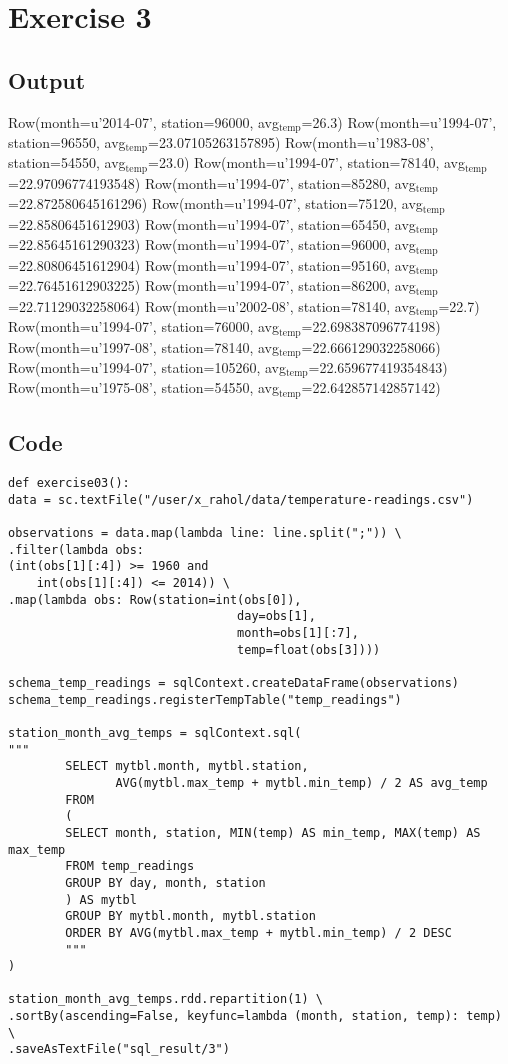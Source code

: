 \documentclass[10pt]{article}
\begin{document}
\newpage
\section*{Exercise 3}
\label{sec-3}
\subsection*{Output}
\label{sec-3-1}
Row(month=u'2014-07', station=96000, avg$_{\text{temp}}$=26.3)
Row(month=u'1994-07', station=96550, avg$_{\text{temp}}$=23.07105263157895)
Row(month=u'1983-08', station=54550, avg$_{\text{temp}}$=23.0)
Row(month=u'1994-07', station=78140, avg$_{\text{temp}}$=22.97096774193548)
Row(month=u'1994-07', station=85280, avg$_{\text{temp}}$=22.872580645161296)
Row(month=u'1994-07', station=75120, avg$_{\text{temp}}$=22.85806451612903)
Row(month=u'1994-07', station=65450, avg$_{\text{temp}}$=22.85645161290323)
Row(month=u'1994-07', station=96000, avg$_{\text{temp}}$=22.80806451612904)
Row(month=u'1994-07', station=95160, avg$_{\text{temp}}$=22.76451612903225)
Row(month=u'1994-07', station=86200, avg$_{\text{temp}}$=22.71129032258064)
Row(month=u'2002-08', station=78140, avg$_{\text{temp}}$=22.7)
Row(month=u'1994-07', station=76000, avg$_{\text{temp}}$=22.698387096774198)
Row(month=u'1997-08', station=78140, avg$_{\text{temp}}$=22.666129032258066)
Row(month=u'1994-07', station=105260, avg$_{\text{temp}}$=22.659677419354843)
Row(month=u'1975-08', station=54550, avg$_{\text{temp}}$=22.642857142857142)
\subsection*{Code}
\label{sec-3-2}
\begin{verbatim}
def exercise03():
data = sc.textFile("/user/x_rahol/data/temperature-readings.csv")

observations = data.map(lambda line: line.split(";")) \
.filter(lambda obs:
(int(obs[1][:4]) >= 1960 and
    int(obs[1][:4]) <= 2014)) \
.map(lambda obs: Row(station=int(obs[0]),
                                day=obs[1],
                                month=obs[1][:7],
                                temp=float(obs[3])))

schema_temp_readings = sqlContext.createDataFrame(observations)
schema_temp_readings.registerTempTable("temp_readings")

station_month_avg_temps = sqlContext.sql(
"""
        SELECT mytbl.month, mytbl.station, 
               AVG(mytbl.max_temp + mytbl.min_temp) / 2 AS avg_temp
        FROM
        (
        SELECT month, station, MIN(temp) AS min_temp, MAX(temp) AS max_temp
        FROM temp_readings
        GROUP BY day, month, station
        ) AS mytbl
        GROUP BY mytbl.month, mytbl.station
        ORDER BY AVG(mytbl.max_temp + mytbl.min_temp) / 2 DESC
        """
)

station_month_avg_temps.rdd.repartition(1) \
.sortBy(ascending=False, keyfunc=lambda (month, station, temp): temp) \
.saveAsTextFile("sql_result/3")
\end{verbatim}
\newpage
\end{document}
